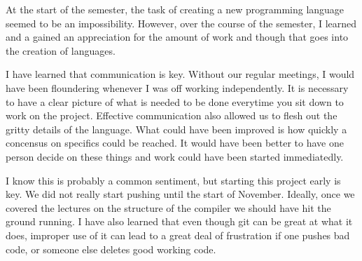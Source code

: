 At the start of the semester, the task of creating a new programming language seemed to be an impossibility. However, over the course of the semester, I learned and a gained an appreciation for the amount of work and though that goes into the creation of languages.

I have learned that communication is key. Without our regular meetings, I would have been floundering whenever I was off working independently. It is necessary to have a clear picture of what is needed to be done everytime you sit down to work on the project. Effective communication also allowed us to flesh out the gritty details of the language. What could have been improved is how quickly a concensus on specifics could be reached. It would have been better to have one person decide on these things and work could have been started immediatedly.

I know this is probably a common sentiment, but starting this project early is key. We did not really start pushing until the start of November. Ideally, once we covered the lectures on the structure of the compiler we should have hit the ground running. I have also learned that even though git can be great at what it does, improper use of it can lead to a great deal of frustration if one pushes bad code, or someone else deletes good working code.